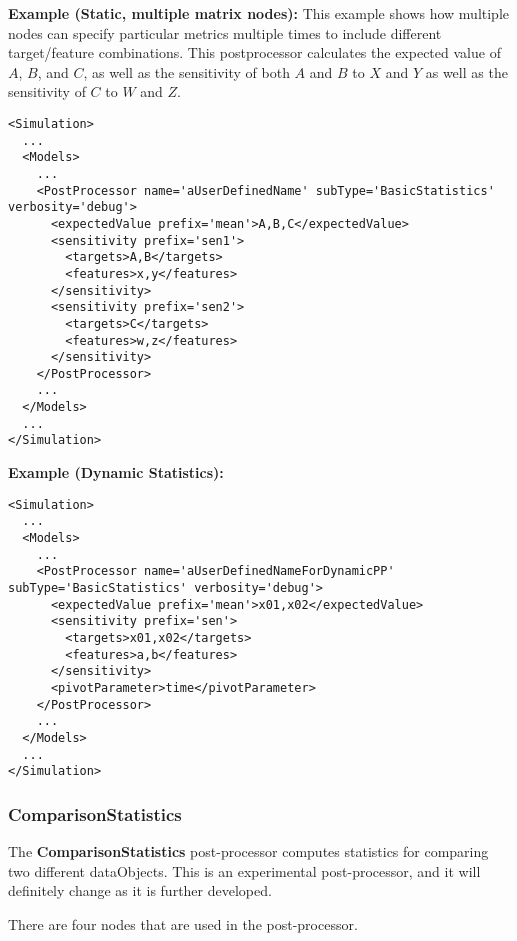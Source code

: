 \textbf{Example (Static, multiple matrix nodes):} This example shows how multiple nodes can specify
particular metrics multiple times to include different target/feature combinations.  This postprocessor
calculates the expected value of $A$, $B$, and $C$, as well as the sensitivity of both $A$ and $B$ to $X$ and
$Y$ as well as the sensitivity of $C$ to $W$ and $Z$.
\begin{lstlisting}[style=XML,morekeywords={name,subType,debug}]
<Simulation>
  ...
  <Models>
    ...
    <PostProcessor name='aUserDefinedName' subType='BasicStatistics' verbosity='debug'>
      <expectedValue prefix='mean'>A,B,C</expectedValue>
      <sensitivity prefix='sen1'>
        <targets>A,B</targets>
        <features>x,y</features>
      </sensitivity>
      <sensitivity prefix='sen2'>
        <targets>C</targets>
        <features>w,z</features>
      </sensitivity>
    </PostProcessor>
    ...
  </Models>
  ...
</Simulation>
\end{lstlisting}
\textbf{Example (Dynamic Statistics):}
\begin{lstlisting}[style=XML,morekeywords={name,subType,debug}]
<Simulation>
  ...
  <Models>
    ...
    <PostProcessor name='aUserDefinedNameForDynamicPP' subType='BasicStatistics' verbosity='debug'>
      <expectedValue prefix='mean'>x01,x02</expectedValue>
      <sensitivity prefix='sen'>
        <targets>x01,x02</targets>
        <features>a,b</features>
      </sensitivity>
      <pivotParameter>time</pivotParameter>
    </PostProcessor>
    ...
  </Models>
  ...
</Simulation>
\end{lstlisting}

\subsubsection{ComparisonStatistics}
\label{ComparisonStatistics}
The \textbf{ComparisonStatistics} post-processor computes statistics
for comparing two different dataObjects.  This is an experimental
post-processor, and it will definitely change as it is further
developed.

There are four nodes that are used in the post-processor.


